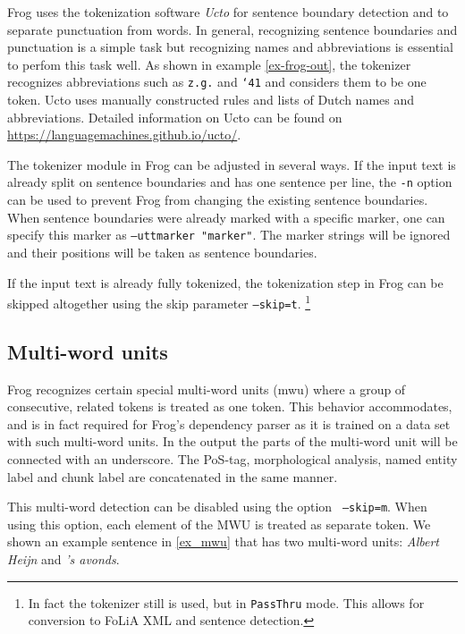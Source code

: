 \documentclass{book}
\begin{document}
Frog uses the tokenization software {\it Ucto} \cite{UCTO} for sentence
boundary detection and to separate punctuation from words. In general,
recognizing sentence boundaries and punctuation is a simple task but
recognizing names and abbreviations is essential to perfom this task well. As
shown in example \ref{ex-frog-out}, the tokenizer recognizes abbreviations such
as {\tt z.g.} and {\tt `41} and considers them to be one token. Ucto uses
manually constructed rules and lists of Dutch names and abbreviations. Detailed
information on Ucto can be found on
\url{https://languagemachines.github.io/ucto/}.

The tokenizer module in Frog can be adjusted in several ways.  If the input
text is already split on sentence boundaries and has one sentence per line, the
{\tt -n} option can be used to prevent Frog from changing the existing sentence
boundaries. When sentence boundaries were already marked with a specific
marker, one can specify this marker as {\tt --uttmarker "marker"}. The marker
strings will be ignored and their positions will be taken as sentence
boundaries.

If the input text is already fully tokenized, the tokenization step in
Frog can be skipped altogether using the skip parameter {\tt --skip=t}.
\footnote{In fact the tokenizer still is used, but in \texttt{PassThru} mode. This allows for conversion to FoLiA XML and sentence detection.}

\subsection{Multi-word units}
\label{sec-mwu}

Frog recognizes certain special multi-word units (mwu) where a group of consecutive, related tokens is treated as one token. This behavior accommodates, and is in fact required for Frog's dependency parser as it is trained on a data set with such multi-word units. In the output the parts of the multi-word unit will be connected with an
underscore. The PoS-tag, morphological analysis, named entity label and chunk
label are concatenated in the same manner.

This multi-word detection can be disabled using the option {\tt
--skip=m}. When using this option, each element of the MWU is treated as
separate token. We shown an example sentence in \ref{ex_mwu} that has two multi-word units: {\it Albert Heijn } and {\it's avonds}. \\ \newline
\end{document}
